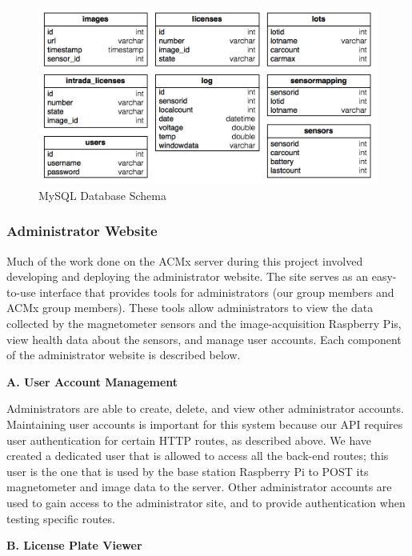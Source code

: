 \documentclass[11pt, oneside, fullpage, doublespace]{article}
\begin{document}
\begin{figure}
\begin{center}
\includegraphics[width=5in]{schema}
\end{center}
\caption{MySQL Database Schema}
\label{fig:schema}
\end{figure}

\subsubsection{Administrator Website}
Much of the work done on the ACMx server during this project involved developing and deploying the administrator website. The site serves as an easy-to-use interface that provides tools for administrators (our group members and ACMx group members). These tools allow administrators to view the data collected by the magnetometer sensors and the image-acquisition Raspberry Pis, view health data about the sensors, and manage user accounts. Each component of the administrator website is described below.

\textbf{A. User Account Management}

Administrators are able to create, delete, and view other administrator accounts. Maintaining user accounts is important for this system because our API requires user authentication for certain HTTP routes, as described above. We have created a dedicated user that is allowed to access all the back-end routes; this user is the one that is used by the base station Raspberry Pi to POST its magnetometer and image data to the server. Other administrator accounts are used to gain access to the administrator site, and to provide authentication when testing specific routes.

\textbf{B. License Plate Viewer}
\end{document}
